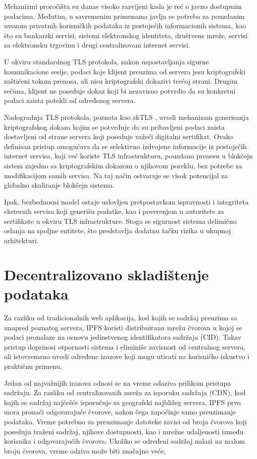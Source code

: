 Mehanizmi proročišta su danas visoko razvijeni kada je reč o javno dostupnim podacima. Međutim, u savremenim primenama javlja se potreba za pouzdanim uvozom privatnih korisničkih podataka iz postojećih informacionih sistema, kao što su bankarski servisi, sistemi elektronskog identiteta, društvene mreže, servisi za elektronsku trgovinu i drugi centralizovani internet servisi.

U okviru standardnog TLS protokola, nakon uspostavljanja sigurne komunikacione sesije, podaci koje klijent preuzima od servera jesu kriptografski zaštićeni tokom prenosa, ali nisu kriptografski dokazivi trećoj strani. Drugim rečima, klijent ne poseduje dokaz koji bi nezavisno potvrdio da su konkretni podaci zaista potekli od određenog servera.

Nadogradnja TLS protokola, poznata kao zkTLS \cite{kireieva2024zktls}, uvodi mehanizam generisanja kriptografskog dokaza kojim se potvrđuje da su pribavljeni podaci zaista dostavljeni od strane servera koji poseduje važeći digitalni sertifikat. Ovako definisan pristup omogućava da se selektivno izdvojene informacije iz postojećih internet servisa, koji već koriste TLS infrastrukturu, pouzdano prenesu u blokčejn sistem zajedno sa kriptografskim dokazom o njihovom poreklu, bez potrebe za modifikacijom samih servisa. Na taj način ostvaruje se visok potencijal za globalno skaliranje blokčejn sistema.

Ipak, bezbednosni model ostaje uslovljen pretpostavkom ispravnosti i integriteta eksternih servisa koji generišu podatke, kao i poverenjem u autoritete za sertifikate u okviru TLS infrastrukture. Stoga se sigurnost sistema delimično oslanja na spoljne entitete, što predstavlja dodatnu tačku rizika u ukupnoj arhitekturi.

\section{Decentralizovano skladištenje podataka}
Za razliku od tradicionalnih web aplikacija, kod kojih se sadržaj preuzima sa unapred poznatog servera, IPFS koristi distribuiranu mrežu čvorova u kojoj se podaci pronalaze na osnovu jedinstvenog identifikatora sadržaja (CID). Takav pristup doprinosi otpornosti sistema i eliminiše zavisnost od centralnog servera, ali istovremeno uvodi određene izazove koji mogu uticati na korisničko iskustvo i praktičnu primenu.

Jedan od najvažnijih izazova odnosi se na vreme odaziva prilikom pristupa sadržaju. Za razliku od centralizovanih mreža za isporuku sadržaja (CDN), kod kojih se sadržaj najčešće isporučuje sa geografski najbližeg servera, IPFS prvo mora pronaći odgovarajuće čvorove, nakon čega započinje samo preuzimanje podataka. Vreme potrebno za preuzimanje datoteke zavisi od broja čvorova koji poseduju traženi sadržaj, njihove dostupnosti, kao i mrežne udaljenosti između korisnika i odgovarajućih čvorova. Ukoliko se određeni sadržaj nalazi na malom broju čvorova, vreme odziva može biti značajno veće.


